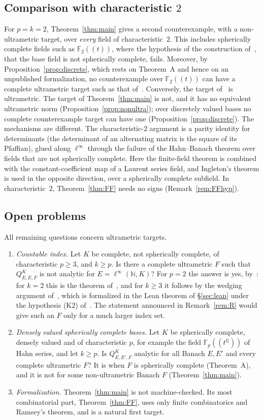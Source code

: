 \documentclass[11pt]{amsart}
\theoremstyle{definition}
\theoremstyle{remark}
\numberwithin{equation}{section}
\newcommand{\linf}{\ell^\infty}
\newcommand{\N}{\mathbb{N}}
\newcommand{\F}{\mathbb{F}}
\begin{document}
\subsection*{Comparison with characteristic \texorpdfstring{$2$}{2}}
For $p=k=2$, Theorem~\ref{thm:main} gives a second counterexample, with a non-ultrametric target, over \emph{every}
field of characteristic~$2$. This includes spherically complete fields such as $\F_2((t))$, where the hypothesis of the
construction of~\cite{M}, that the base field is not spherically complete, fails. Moreover, by
Proposition~\ref{prop:discrete}, which rests on Theorem~A and hence on an unpublished formalization, no counterexample over $\F_2((t))$ can have a complete
ultrametric target such as that of~\cite{M}. Conversely, the target of~\cite{M} is ultrametric. The target of
Theorem~\ref{thm:main} is not, and it has no equivalent ultrametric norm (Proposition~\ref{prop:nonultra}); over
discretely valued bases no complete counterexample target can have one (Proposition~\ref{prop:discrete}). The mechanisms are
different. The characteristic-$2$ argument is a parity identity for determinants (the determinant of an alternating
matrix is the square of its Pfaffian), glued along $\linf$ through the failure of the Hahn--Banach theorem over fields
that are not spherically complete. Here the finite-field theorem is combined with the constant-coefficient map of a
Laurent series field, and Ingleton's theorem is used in the opposite direction, over a spherically complete subfield.
In characteristic~$2$, Theorem~\ref{thm:FF} needs no signs (Remark~\ref{rem:FFhyp}).

\subsection*{Open problems}
All remaining questions concern ultrametric targets.
\begin{enumerate}
\item \emph{Countable index.} Let $K$ be complete, not spherically complete, of characteristic $p\ge3$, and $k\ge p$.
Is there a complete ultrametric $F$ such that $Q^K_{E,E,F}$ is not analytic for $E=\linf(\N,K)$? For $p=2$ the answer
is yes, by~\cite{M}: for $k=2$ this is the theorem of~\cite{M}, and for $k\ge3$ it follows by the wedging argument
of~\cite[Remark~18]{M}, which is formalized in the Lean theorem of \S\ref{sec:lean} under the hypothesis (K2)
of~\cite{M}. The statement announced in Remark~\ref{rem:R} would give such an $F$ only for a much larger index set.
\item \emph{Densely valued spherically complete bases.} Let $K$ be spherically complete, densely valued and of
characteristic $p$, for example the field $\F_p((t^{\mathbb Q}))$ of Hahn series, and let $k\ge p$. Is $Q^K_{E,E',F}$ analytic for all Banach $E,E'$ and every
complete ultrametric $F$? It is when $F$ is spherically complete (Theorem~A), and it is not for some non-ultrametric
Banach $F$ (Theorem~\ref{thm:main}).
\item \emph{Formalization.} Theorem~\ref{thm:main} is not machine-checked. Its most combinatorial part,
Theorem~\ref{thm:FF}, uses only finite combinatorics and Ramsey's theorem, and is a natural first target.
\end{enumerate}
\end{document}
